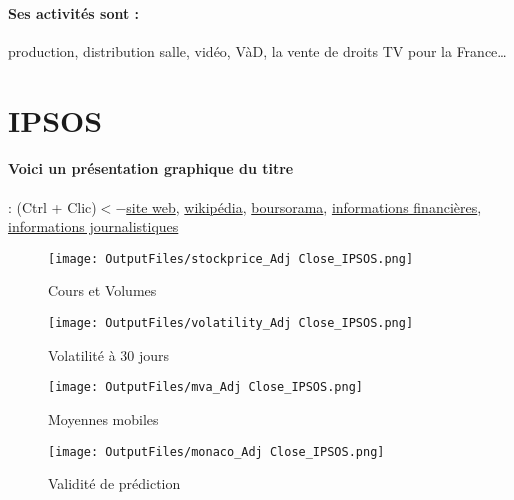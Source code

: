 \documentclass[11pt,a4paper]{report}%
\begin{document}
\paragraph{Ses activités sont : } production, distribution salle, vidéo, VàD, la vente de droits TV pour la France… 
    
    \newpage

\section{IPSOS}

\paragraph{Voici un présentation graphique du titre} : (Ctrl + Clic)$<-$\href{https://www.ipsos.com/en/investisseurs}{site web}, \href{https://fr.wikipedia.org/wiki/Ipsos}{wikipédia}, \href{https://www.boursorama.com/cours/1rPIPS}{boursorama}, \href{https://www.qwant.com/?q=site:https:%2f%2fwww.easybourse.com%2faction-societe%2fIPSOS&t=web&client=ext-firefox-hp}{informations financières}, \href{https://bourse.lerevenu.com/cours-de-bourse/fiche-valeur-synthese/IPSOS/IPS-FR}{informations journalistiques}
\begin{figure}[!htb]
   \begin{minipage}{0.5\textwidth}
     \centering
     \texttt{[image: OutputFiles/stockprice\_Adj Close\_IPSOS.png]}
     \caption{Cours et Volumes}\label{Fig:price_IPSOS}
   \end{minipage}\hfill
   \begin{minipage}{0.5\textwidth}
     \centering
     \texttt{[image: OutputFiles/volatility\_Adj Close\_IPSOS.png]}
     \caption{Volatilité à 30 jours}\label{Fig:volat_IPSOS}
   \end{minipage}
\end{figure}
\begin{figure}[!htb]
   \begin{minipage}{0.5\textwidth}
     \centering
     \texttt{[image: OutputFiles/mva\_Adj Close\_IPSOS.png]}
     \caption{Moyennes mobiles}\label{Fig:mva_IPSOS}
   \end{minipage}\hfill
   \begin{minipage}{0.5\textwidth}
     \centering
     \texttt{[image: OutputFiles/monaco\_Adj Close\_IPSOS.png]}
     \caption{Validité de prédiction}\label{Fig:prediction_IPSOS}
   \end{minipage}
\end{figure}
\end{document}
